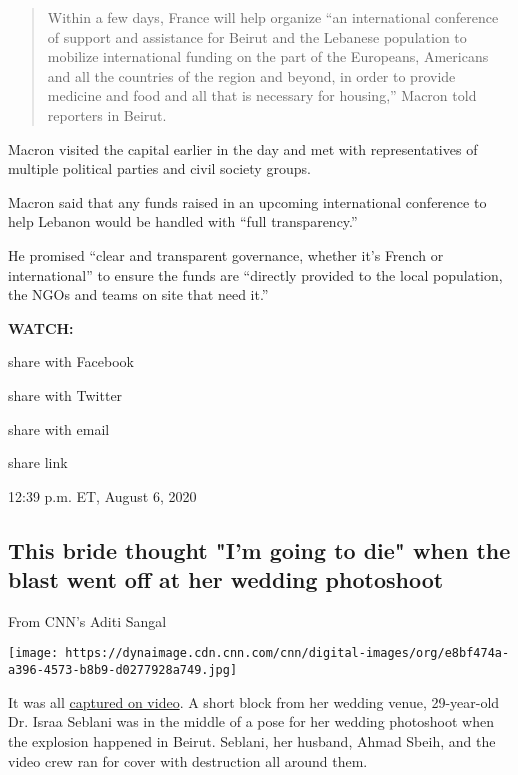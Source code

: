 \begin{quote}
Within a few days, France will help organize ``an international
conference of support and assistance for Beirut and the Lebanese
population to mobilize international funding on the part of the
Europeans, Americans and all the countries of the region and beyond, in
order to provide medicine and food and all that is necessary for
housing,'' Macron told reporters in Beirut.
\end{quote}

Macron visited the capital earlier in the day and met with
representatives of multiple political parties and civil society groups.~

Macron said that any funds raised in an upcoming international
conference to help Lebanon would be handled with ``full transparency.''

He promised ``clear and transparent governance, whether it's French or
international'' to ensure the funds are ``directly provided to the local
population, the NGOs and teams on site that need it.''

\textbf{WATCH:}

share with Facebook

share with Twitter

share with email

share link

12:39 p.m. ET, August 6, 2020

\hypertarget{this-bride-thought-im-going-to-die-when-the-blast-went-off-at-her-wedding-photoshoot}{%
\subsection{This bride thought "I'm going to die" when the blast went
off at her wedding
photoshoot}\label{this-bride-thought-im-going-to-die-when-the-blast-went-off-at-her-wedding-photoshoot}}

From CNN's Aditi Sangal

\texttt{[image: https://dynaimage.cdn.cnn.com/cnn/digital-images/org/e8bf474a-a396-4573-b8b9-d0277928a749.jpg]}

It was all
\href{https://www.cnn.com/2020/08/05/middleeast/beirut-explosion-couple-wedding-shoot-trnd/index.html}{captured
on video}. A short block from her wedding venue, 29-year-old Dr. Israa
Seblani was in the middle of a pose for her wedding photoshoot when the
explosion happened in Beirut. Seblani, her husband, Ahmad Sbeih, and the
video crew ran for cover with destruction all around them.


